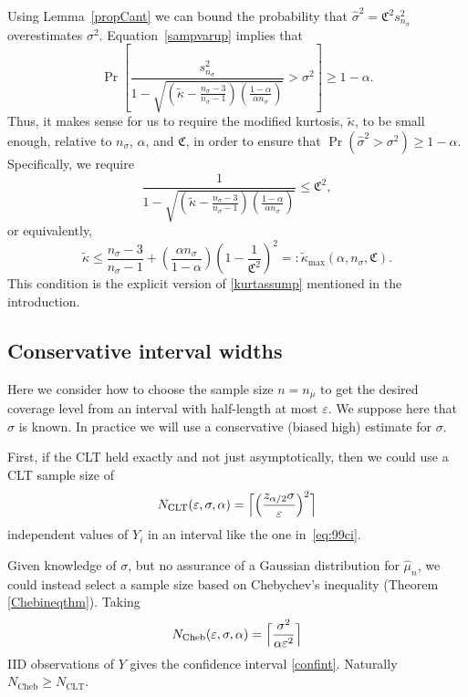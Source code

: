 \documentclass[graybox]{svmult}
\newcommand{\fudge}{\mathfrak{C}}
\newcommand{\Prob}{\Pr}
\newcommand{\tkappa}{\tilde{\kappa}}
\begin{document}
Using Lemma~\ref{propCant} we can bound the probability
that $\hat\sigma^2 = \fudge^2 s^2_{n_\sigma}$ overestimates $\sigma^2$.
Equation~\eqref{sampvarup} implies that
\begin{equation*} %
\Prob \left[\frac{s^2_{n_{\sigma}}}{1 - \sqrt{\left ( \tilde\kappa  - \frac{n_{\sigma}-3}{n_{\sigma}-1}\right)\left(\frac{1-\alpha}{\alpha n_{\sigma}}\right)}} > \sigma^2 \right] \ge 1 - \alpha.
\end{equation*}
Thus, it makes sense for us to require the modified kurtosis, $\tkappa$, to be small enough, relative to $n_{\sigma}$, $\alpha$, and $\fudge$, in order to ensure 
that $\Pr(\hat\sigma^2 > \sigma^2) \ge 1-\alpha$. Specifically, we require
$$
\frac{1}{1 - \sqrt{\left ( \tilde\kappa  - \frac{n_{\sigma}-3}{n_{\sigma}-1}\right)\left(\frac{1-\alpha}{\alpha n_{\sigma}}\right)}} \le \fudge^2,
$$
or equivalently,
\begin{equation}
\label{kappamaxdef}
\tilde\kappa \le \frac{n_{\sigma}-3}{n_{\sigma}-1} + \left(\frac{ \alpha n_{\sigma}}{1-\alpha}\right) \left(1 - \frac{1}{\fudge^2}\right)^2 =: \tilde\kappa_{\max} (\alpha,n_{\sigma},\fudge). 
\end{equation}
This condition is the explicit version of \eqref{kurtassump} mentioned in the introduction.

\subsection{Conservative interval widths}

Here we consider how to choose the sample size
$n=n_\mu$ to get the desired coverage level
from an interval with half-length at most $\varepsilon$.
We suppose here that $\sigma$ is known.  
In practice we will use a conservative (biased high) estimate
for $\sigma$.

First, if the CLT held exactly and not just asymptotically,
then we could use a CLT sample size of
$$
N_{\mathrm{CLT}}(\varepsilon,\sigma,\alpha)
= 
\Bigl\lceil
\Bigl(
\frac{z_{\alpha/2}\sigma}{\varepsilon}
\Bigr)^2
\Bigr\rceil
$$
independent values of $Y_i$ in an interval
like the one in~\eqref{eq:99ci}.

Given knowledge of $\sigma$, but no assurance
of a Gaussian distribution for $\hat\mu_n$, we
could instead select a sample size based on
Chebychev's inequality (Theorem \ref{Chebineqthm}).  Taking
\begin{equation}\label{NCdef}
N_{\text{Cheb}}(\varepsilon,\sigma,\alpha)
= 
\Bigl\lceil\frac{\sigma^2}{\alpha\varepsilon^2}\Bigr\rceil
\end{equation}
IID observations of $Y$ gives the confidence interval \eqref{confint}.
Naturally $N_{\text{Cheb}}\ge N_{\text{CLT}}$.
\end{document}
